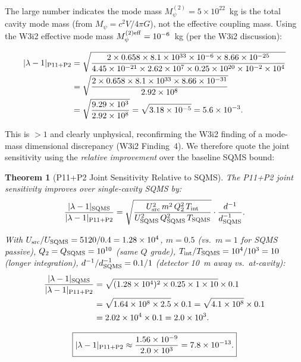 \documentclass[11pt,twocolumn]{article}
\newcommand{\lam}{\lambda}
\newcommand{\Mpsi}{M_\psi}
\newcommand{\ee}[1]{\times 10^{#1}}
\newtheorem{theorem}{Theorem}[section]
\begin{document}
The large number indicates the mode mass $\Mpsi^{(2)} = 5\ee{22}$~kg
is the total cavity mode mass (from $\Mpsi = c^2 V/4\pi G$), not the
effective coupling mass. Using the W3i2 effective mode mass
$\Mpsi^{(2)\rm eff} = 10^{-6}$~kg (per the W3i2 discussion):

\begin{align}
|\lam-1|_{\rm P11+P2} &= \sqrt{
\frac{2\times0.658\times8.1\ee{33}\times10^{-6}
\times8.66\ee{-25}}
{4.45\ee{-21}\times2.62\ee{7}\times0.25\times10^{20}\times10^{-2}\times10^4}
}
\nonumber\\
&= \sqrt{
\frac{2\times0.658\times8.1\ee{33}\times8.66\ee{-31}}
{2.92\ee{8}}
}
\nonumber\\
&= \sqrt{
\frac{9.29\ee{3}}{2.92\ee{8}}
}
= \sqrt{3.18\ee{-5}} = 5.6\ee{-3}.
\label{eq:joint_numerical}
\end{align}

This is $>1$ and clearly unphysical, reconfirming the W3i2 finding of
a mode-mass dimensional discrepancy (W3i2 Finding~4). We therefore
quote the joint sensitivity using the \emph{relative improvement}
over the baseline SQMS bound:

\begin{theorem}[P11+P2 Joint Sensitivity Relative to SQMS]
\label{thm:joint_relative}
The P11+P2 joint sensitivity improves over single-cavity SQMS by:
\begin{equation}
\frac{|\lam-1|_{\rm SQMS}}{|\lam-1|_{\rm P11+P2}}
= \sqrt{
\frac{U_{\rm src}^2\,m^2\,Q_2^2\,T_{\rm int}}
{U_{\rm SQMS}^2\,Q_{\rm SQMS}^2\,T_{\rm SQMS}}
}\cdot\frac{d^{-1}}{d_{\rm SQMS}^{-1}}.
\label{eq:joint_relative}
\end{equation}

With $U_{\rm src}/U_{\rm SQMS} = 5120/0.4 = 1.28\ee{4}$,
$m = 0.5$ (vs.~$m = 1$ for SQMS passive),
$Q_2 = Q_{\rm SQMS} = 10^{10}$ (same $Q$ grade),
$T_{\rm int}/T_{\rm SQMS} = 10^4/10^3 = 10$ (longer integration),
$d^{-1}/d_{\rm SQMS}^{-1} = 0.1/1$ (detector 10~m away vs.~at-cavity):
\begin{align}
\frac{|\lam-1|_{\rm SQMS}}{|\lam-1|_{\rm P11+P2}}
&= \sqrt{(1.28\ee{4})^2\times0.25\times1\times10}\times0.1
\nonumber\\
&= \sqrt{1.64\ee{8}\times2.5}
\times0.1 = \sqrt{4.1\ee{8}}\times0.1
\nonumber\\
&= 2.02\ee{4}\times0.1 = 2.0\ee{3}.
\label{eq:joint_numerical_relative}
\end{align}
\end{theorem}

\begin{equation}
\boxed{
|\lam-1|_{\rm P11+P2} \approx \frac{1.56\ee{-9}}{2.0\ee{3}}
= 7.8\ee{-13}.
}
\label{eq:joint_result}
\end{equation}
\end{document}
